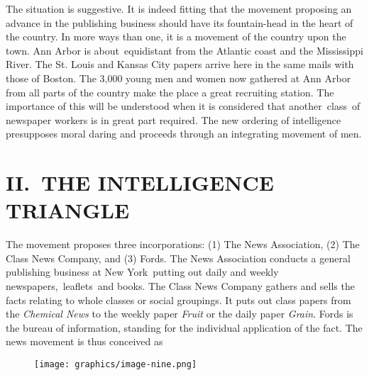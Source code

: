 \documentclass[twoside,symmetric,nobib,justified]{tufte-book}
\begin{document}
The situation is suggestive. It is indeed fitting that the movement
proposing an advance in the publishing business should have its
fountain-head in the heart of the country. In more ways than one, it is
a movement of the country upon the town. Ann Arbor is about~equidistant
from the Atlantic coast and the Mississippi River. The St. Louis and
Kansas City papers arrive here in the same mails with those of Boston.
The 3,000 young men and women now gathered at Ann Arbor from all parts
of the country make the place a great recruiting station. The importance
of this will be understood when it is considered that another~class~of
newspaper workers is in great part required. The new ordering of
intelligence presupposes moral daring and proceeds through an
integrating movement of men.

\hypertarget{ii-the-intelligence-triangle}{%
\section{II.~THE INTELLIGENCE
TRIANGLE}\label{ii-the-intelligence-triangle}}

The movement proposes three incorporations: (1) The News Association,
(2) The Class News Company, and (3) Fords. The News Association conducts
a general publishing business at New York~putting out daily and weekly
newspapers,~leaflets~and books. The Class News Company gathers and sells
the facts relating to whole classes or social groupings. It puts out
class papers from the \emph{Chemical News} to the weekly paper
\emph{Fruit} or the daily paper \emph{Grain}. Fords is the bureau of
information, standing for the individual application of the fact. The
news movement is thus conceived as~


    


\begin{figure}
 \setlength{\parindent}{145pt}\texttt{[image: graphics/image-nine.png]}
   \label{fig:fig3}
\end{figure}
\end{document}
